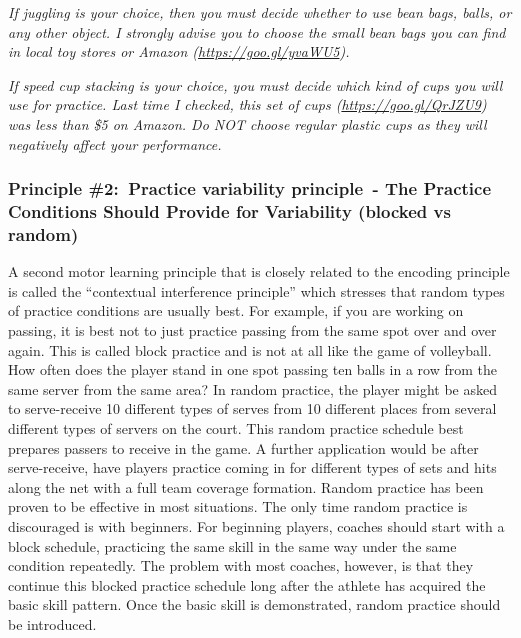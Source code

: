 \documentclass[
  letterpaper,
  DIV=11,
  numbers=noendperiod]{scrartcl}
\begin{document}
\emph{If juggling is your choice, then you must decide whether to use
bean bags, balls, or any other object. I strongly advise you to choose
the small bean bags you can find in local toy stores or Amazon
(\url{https://goo.gl/yvaWU5}).}

\emph{If speed cup stacking is your choice, you must decide which kind
of cups you will use for practice. Last time I checked, this set of cups
(\url{https://goo.gl/QrJZU9}) was less than \$5 on Amazon. Do NOT choose
regular plastic cups as they will negatively affect your performance.}

\hypertarget{principle-2-practice-variability-principle---the-practice-conditions-should-provide-for-variability-blocked-vs-random}{%
\subsubsection{\texorpdfstring{\textbf{Principle \#2:~Practice
variability principle~- The Practice Conditions Should Provide for
Variability (blocked vs
random)}}{Principle \#2:~Practice variability principle~- The Practice Conditions Should Provide for Variability (blocked vs random)}}\label{principle-2-practice-variability-principle---the-practice-conditions-should-provide-for-variability-blocked-vs-random}}

A second motor learning principle that is closely related to the
encoding principle is called the ``contextual interference principle''
which stresses that random types of practice conditions are usually
best. For example, if you are working on passing, it is best not to just
practice passing from the same spot over and over again. This is called
block practice and is not at all like the game of volleyball. How often
does the player stand in one spot passing ten balls in a row from the
same server from the same area? In random practice, the player might be
asked to serve-receive 10 different types of serves from 10 different
places from several different types of servers on the court. This random
practice schedule best prepares passers to receive in the game. A
further application would be after serve-receive, have players practice
coming in for different types of sets and hits along the net with a full
team coverage formation. Random practice has been proven to be effective
in most situations. The only time random practice is discouraged is with
beginners. For beginning players, coaches should start with a block
schedule, practicing the same skill in the same way under the same
condition repeatedly. The problem with most coaches, however, is that
they continue this blocked practice schedule long after the athlete has
acquired the basic skill pattern. Once the basic skill is demonstrated,
random practice should be introduced.
\end{document}
